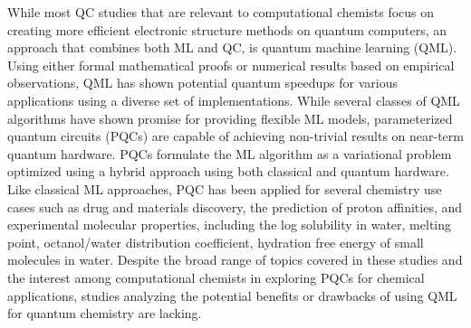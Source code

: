 \documentclass[journal=jacsat,manuscript=article]{achemso}
\begin{document}
While most QC studies that are relevant to computational chemists focus on creating more efficient electronic structure methods on quantum computers\cite{romero_strategies_2019,mcardle_quantum_2020,bauer_quantum_2020,cao_quantum_2019}, an approach that combines both ML and QC, is quantum machine learning (QML).
Using either formal mathematical proofs or numerical results based on empirical observations, QML has shown potential quantum speedups for various applications using a diverse set of implementations.\cite{biamonte_quantum_2017}
While several classes of QML algorithms have shown promise for providing flexible ML models, parameterized quantum circuits (PQCs) are capable of achieving non-trivial results on near-term quantum hardware.
PQCs formulate the ML algorithm as a variational problem optimized using a hybrid approach using both classical and quantum hardware.\cite{benedetti_parameterized_2019}
Like classical ML approaches, PQC has been applied for several chemistry use cases such as drug\cite{suzuki_predicting_2020,smaldone_quantum--classical_2024,bhatia_quantum_2023,kao_exploring_2023,li_quantum_2021,avramouli_quantum_2023,avramouli_unlocking_2023} and materials discovery\cite{ishiyama_noise-robust_2022,ryu_quantum_2023,vitz_hybrid_2024}, the prediction of proton affinities\cite{jin_integrating_2025}, and experimental molecular properties, including the log solubility in water, melting point, octanol/water distribution coefficient, hydration free energy of small molecules in water.\cite{hatakeyama-sato_quantum_2023}
Despite the broad range of topics covered in these studies and the interest among computational chemists in exploring PQCs for chemical applications, studies analyzing the potential benefits or drawbacks of using QML for quantum chemistry are lacking. 
\end{document}

